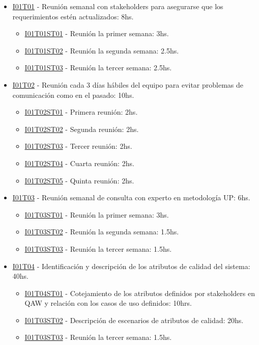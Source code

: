 \begin{itemize}
\item \underline{I01T01} - Reunión semanal con stakeholders para asegurarse que los requerimientos estén actualizados: 8hs.
  \begin{itemize}
    \item \underline{I01T01ST01} - Reunión la primer semana: 3hs.
    \item \underline{I01T01ST02} - Reunión la segunda semana: 2.5hs.
    \item \underline{I01T01ST03} - Reunión la tercer semana: 2.5hs.
  \end{itemize}

\item \underline{I01T02} - Reunión cada 3 días hábiles del equipo para evitar problemas de comunicación como en el pasado: 10hs.
  \begin{itemize}
    \item \underline{I01T02ST01} - Primera reunión: 2hs.
    \item \underline{I01T02ST02} - Segunda reunión: 2hs.
    \item \underline{I01T02ST03} - Tercer reunión: 2hs.
    \item \underline{I01T02ST04} - Cuarta reunión: 2hs.
    \item \underline{I01T02ST05} - Quinta reunión: 2hs.
  \end{itemize}

\item \underline{I01T03} - Reunión semanal de consulta con experto en metodología UP: 6hs.
  \begin{itemize}
    \item \underline{I01T03ST01} - Reunión la primer semana: 3hs.
    \item \underline{I01T03ST02} - Reunión la segunda semana: 1.5hs.
    \item \underline{I01T03ST03} - Reunión la tercer semana: 1.5hs.
  \end{itemize}

\item \underline{I01T04} - Identificación y descripción de los atributos de calidad del sistema: 40hs.
  \begin{itemize}
    \item \underline{I01T04ST01} - Cotejamiento de los atributos definidos por stakeholders en QAW y relación con los casos de uso definidos: 10hrs.
    \item \underline{I01T03ST02} - Descripción de escenarios de atributos de calidad: 20hs.
    \item \underline{I01T03ST03} - Reunión la tercer semana: 1.5hs.
  \end{itemize}



\end{itemize}
